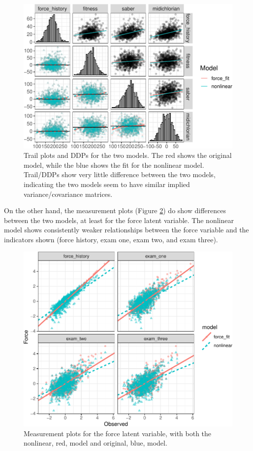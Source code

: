 \documentclass[
  english,
  man]{apa6}
\begin{document}
\begin{figure}

{\centering \includegraphics[width=0.9\linewidth]{flexplavaan_draft_files/figure-latex/trailnl-1} 

}

\caption{Trail plots and DDPs for the two models. The red shows the original model, while the blue shows the fit for the nonlinear model. Trail/DDPs show very little difference between the two models, indicating the two models seem to have similar implied variance/covariance matrices.}\label{fig:trailnl}
\end{figure}

On the other hand, the measurement plots (Figure \ref{fig:measnl}) do show differences between the two models, at least for the force latent variable. The nonlinear model shows consistently weaker relationships between the force variable and the indicators shown (force history, exam one, exam two, and exam three).

\begin{figure}

{\centering \includegraphics[width=0.7\linewidth]{flexplavaan_draft_files/figure-latex/measnl-1} 

}

\caption{Measurement plots for the force latent variable, with both the nonlinear, red, model and original, blue, model.}\label{fig:measnl}
\end{figure}
\end{document}
